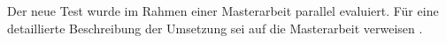 


Der neue Test wurde im Rahmen einer Masterarbeit parallel evaluiert. Für eine detaillierte Beschreibung der Umsetzung sei auf die Masterarbeit verweisen \citep{Sichau2015a}.
